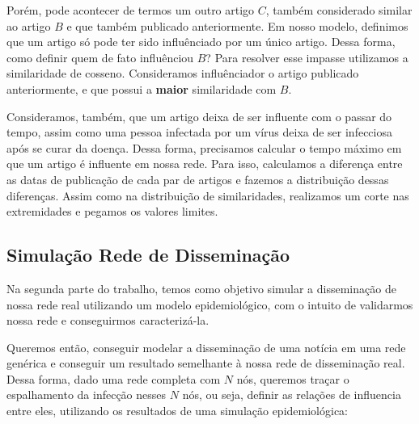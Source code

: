 \documentclass[a4paper,12pt]{article}
\begin{document}
\begin{description}
    \pagebreak

    Porém, pode acontecer de termos um outro artigo $C$, também considerado similar ao artigo $B$ e que também publicado anteriormente. Em nosso modelo,
    definimos que um artigo só pode ter sido influênciado por um único artigo. Dessa forma, como definir quem de fato influênciou $B$? Para
    resolver esse impasse utilizamos a similaridade de cosseno. Consideramos influênciador o artigo publicado anteriormente, e que possui
    a \textbf{maior} similaridade com $B$.
    
    Consideramos, também, que um artigo deixa de ser influente com o passar do tempo, assim como uma pessoa infectada por um vírus deixa
    de ser infecciosa após se curar da doença. Dessa forma, precisamos calcular o tempo máximo em que um artigo é influente em nossa rede.
    Para isso, calculamos a diferença entre as datas de publicação de cada par de artigos e fazemos a distribuição dessas diferenças. Assim como
    na distribuição de similaridades, realizamos um corte nas extremidades e pegamos os valores limites.
 \end{description}
 

\subsection{Simulação Rede de Disseminação}

Na segunda parte do trabalho, temos como objetivo simular a disseminação de nossa rede real utilizando um modelo epidemiológico, com o intuito
de validarmos nossa rede e conseguirmos caracterizá-la.

Queremos então, conseguir modelar a disseminação de uma notícia em uma rede genérica e conseguir um resultado semelhante à nossa rede de
disseminação real. Dessa forma, dado uma rede completa com $N$ nós, queremos traçar o espalhamento da infecção nesses $N$ nós, ou seja, definir
as relações de influencia entre eles, utilizando os resultados de uma simulação epidemiológica:
\vspace{0.4cm}
\end{document}
